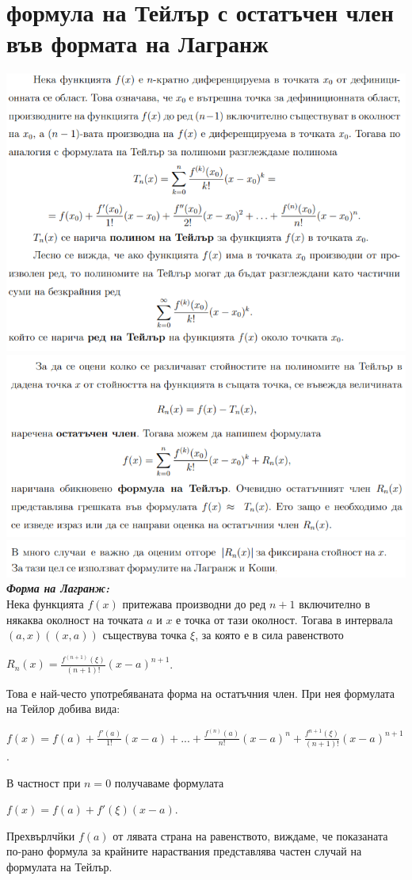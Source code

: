 \documentclass[11pt]{article} %
\begin{document}
\section{формула на Тейлър с остатъчен член във формата на Лагранж}
\includegraphics[scale=0.85]{Taylor1.png}\\
\includegraphics[scale=0.85]{Taylor2.png}\\
\includegraphics[scale=0.85]{Taylor3.png}\\
\textit{\textbf{Форма на Лагранж:}}\\
Нека функцията $f(x)$ притежава производни до ред $n+1$ включително в някаква околност на точката $a$ и $x$ е точка от тази околност. Тогава в интервала $(a,x)((x,a))$ съществува точка $\xi$, за която е в сила равенството \\
\centerline{$R_{n}(x) = \frac{f^{(n+1)}(\xi)}{(n+1)!}(x-a)^{n+1}$.}
\par
Това е най-често употребяваната форма на остатъчния член. При нея формулата на Тейлор добива вида:\\
\centerline{$f(x)=f(a)+\frac{f'(a)}{1!}(x-a)+...+\frac{f^{(n)}(a)}{n!}(x-a)^{n}+\frac{f^{n+1}(\xi)}{(n+1)!}(x-a)^{n+1}$.}
В частност при $n=0$ получаваме формулата \\
\centerline{$f(x)=f(a)+f'(\xi)(x-a)$.}
Прехвърлчйки $f(a)$ от лявата страна на равенството, виждаме, че показаната по-рано формула за крайните нараствания представлява частен случай на формулата на Тейлър.  

  
\end{document}
